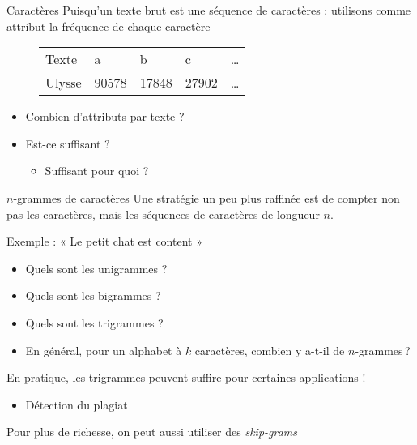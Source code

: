 \documentclass[xcolor={svgnames}, french]{beamer}
\begin{document}
\begin{frame}[fragile=singleslide]{Caractères}
	Puisqu'un texte brut est une séquence de caractères : utilisons comme attribut la fréquence de chaque caractère

	\begin{figure}
		\begin{tabu}{*{5}{>{\ttfamily\small}X[m, c]}}
			Texte   & a & b & c & …\\
			Ulysse  & 90578 & 17848 & 27902 & …
		\end{tabu}
	\end{figure}

	\begin{itemize}
		\item Combien d'attributs par texte ?
		\item Est-ce suffisant ?
			\begin{itemize}
				\item Suffisant pour quoi ?
			\end{itemize}
	\end{itemize}
\end{frame}

\begin{frame}{$n$-grammes de caractères}
	Une stratégie un peu plus raffinée est de compter non pas les caractères, mais les séquences de caractères de longueur $n$.

	Exemple : « Le petit chat est content »

	\begin{itemize}
		\item Quels sont les unigrammes ?
		\item Quels sont les bigrammes ?
		\item Quels sont les trigrammes ?
		\item En général, pour un alphabet à $k$ caractères, combien y a-t-il de $n$-grammes ?
	\end{itemize}

	En pratique, les trigrammes peuvent suffire pour certaines applications !
	\begin{itemize}
		\item Détection du plagiat
	\end{itemize}

	Pour plus de richesse, on peut aussi utiliser des \emph{skip-grams}
\end{frame}


\end{document}
